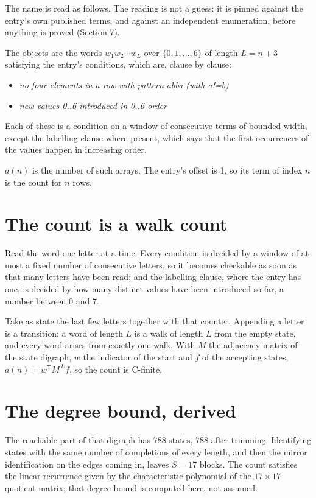 \documentclass[11pt]{article}
\theoremstyle{definition}
\begin{document}
The name is read as follows. The reading is not a guess: it is pinned against the entry's own published terms, and against an independent enumeration, before anything is proved (Section 7).

The objects are the words $w_1 w_2 \cdots w_L$ over $\{0,1,\dots,6\}$ of length $L = n + 3$ satisfying the entry's conditions, which are, clause by clause:

\begin{itemize}

\item {\itshape no four elements in a row with pattern abba (with a!=b)}

\item {\itshape new values 0..6 introduced in 0..6 order}

\end{itemize}

Each of these is a condition on a window of consecutive terms of bounded width, except the labelling clause where present, which says that the first occurrences of the values happen in increasing order.

$a(n)$ is the number of such arrays. The entry's offset is 1, so its term of index $n$ is the count for $n$ rows.

\section{The count is a walk count}

Read the word one letter at a time. Every condition is decided by a window of at most a fixed number of consecutive letters, so it becomes checkable as soon as that many letters have been read; and the labelling clause, where the entry has one, is decided by how many distinct values have been introduced so far, a number between $0$ and 7.

Take as state the last few letters together with that counter. Appending a letter is a transition; a word of length $L$ is a walk of length $L$ from the empty state, and every word arises from exactly one walk. With $M$ the adjacency matrix of the state digraph, $w$ the indicator of the start and $f$ of the accepting states, $a(n) = w^{\mathsf T}M^{\,L}f$, so the count is C-finite.

\section{The degree bound, derived}

The reachable part of that digraph has $788$ states, $788$ after trimming. Identifying states with the same number of completions of every length, and then the mirror identification on the edges coming in, leaves $S = 17$ blocks. The count satisfies the linear recurrence given by the characteristic polynomial of the $17\times17$ quotient matrix; that degree bound is computed here, not assumed.
\end{document}
